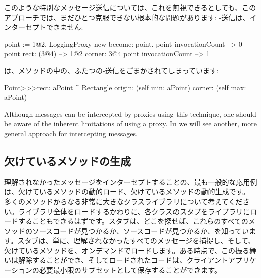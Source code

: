 \documentclass[a4paper,10pt,twoside]{book}
\begin{document}
このような特別なメッセージ送信については、これを無視できるとしても、このアプローチでは、まだひとつ克服できない根本的な問題があります: \self-送信は、インターセプトできません:
\begin{code}{}
point := 1@2.
LoggingProxy new become: point.
point invocationCount --> 0
point rect: (3@4)        --> 1@2 corner: 3@4
point invocationCount --> 1
\end{code}

は、メソッドの中の、ふたつの\self-送信をごまかされてしまっています: %
\begin{code}{}
Point>>>rect: aPoint 
	^ Rectangle  origin: (self min: aPoint) corner: (self max: aPoint)
\end{code}

Although messages can be intercepted by proxies using this technique, one should be aware of the inherent limitations of using a proxy.  In  we will see another, more general approach for intercepting messages.

\subsection{欠けているメソッドの生成}

理解されなかったメッセージをインターセプトすることの、最も一般的な応用例は、欠けているメソッドの動的ロード、欠けているメソッドの動的生成です。
多くのメソッドからなる非常に大きなクラスライブラリについて考えてください。ライブラリ全体をロードするかわりに、各クラスのスタブをライブラリにロードすることもできるはずです。スタブは、どこを探せば、これらのすべてのメソッドのソースコードが見つかるか、ソースコードが見つかるか、を知っています。スタブは、単に、理解されなかったすべてのメッセージを捕捉し、そして、欠けているメソッドを、オンデマンドでロードします。ある時点で、この振る舞いは解除することができ、そしてロードされたコードは、クライアントアプリケーションの必要最小限のサブセットとして保存することができます。
\end{document}
